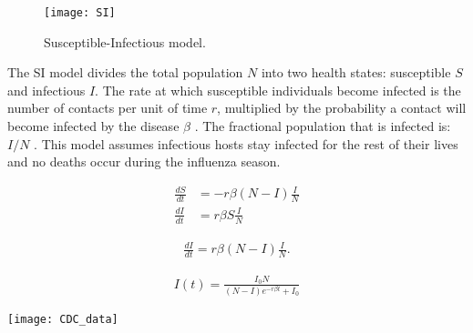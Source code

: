 \documentclass[a0, landscape, final]{a0poster}
\begin{document}
\begin{multicols}{4}

\begin{definition*}[\textcolor{white}{Endemic Model}]
\begin{figure}[H]
	\begin{center}
	\begin{center}
	\texttt{[image: SI]}
	\caption{Susceptible-Infectious model.}
	\end{center}
	\end{center}
\end{figure} 

The SI model divides the total population $N$ into two health states: susceptible $S$ and infectious $I$. The rate at which susceptible individuals become infected is the number of contacts per unit of time $r$, multiplied by the probability a contact will become infected by the disease $\beta$ \cite{Chitnis:2011aa}. The fractional population that is infected is: $I/N$ \cite{Chitnis:2011aa}. This model assumes infectious hosts stay infected for the rest of their lives and no deaths occur during the influenza season.

\begin{subequations}
\begin{align}
\frac{dS}{dt} &= -r \beta(N-I)\frac{I}{N} \\
\frac{dI}{dt}  &=  r \beta S \frac{I}{N}
\end{align}
\end{subequations}

\begin{align}
\frac{dI}{dt} = r \beta (N-I) \frac{I}{N}.
\end{align}

\begin{align}
I(t) = \frac{I_0N}{(N-I)e^{-r \beta t} + I_0}
\end{align}
\end{definition*}

\begin{definition*}[\textcolor{white}{Data}]
\begin{center}
\texttt{[image: CDC\_data]}
\end{center}
\end{definition*}


\end{multicols}
\end{document}
